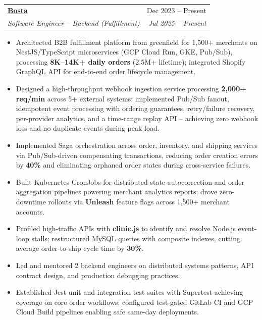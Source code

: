 \documentclass[letterpaper,11pt]{article}
\makeatletter
\newcommand{\resumeItem}[1]{
  \item\small{{#1 \vspace{-2pt}}}
}
\newcommand{\resumeSubheading}[4]{
  \vspace{-2pt}\item
    \begin{tabular*}{0.97\textwidth}[t]{l@{\extracolsep{\fill}}r}
      \textbf{#1} & #2 \\
      \textit{\small#3} & \textit{\small #4} \\
    \end{tabular*}\vspace{-7pt}
}
\newcommand{\resumeItemListStart}{\begin{itemize}}
\newcommand{\resumeItemListEnd}{\end{itemize}\vspace{-5pt}}
\makeatother
\begin{document}
    \resumeSubheading
      {\href{https://bosta.co/en-eg/home}{Bosta}}{Dec 2023 -- Present}
      {Software Engineer -- Backend (Fulfillment)}{Jul 2025 -- Present}
      \resumeItemListStart
        \resumeItem{Architected B2B fulfillment platform from greenfield for 1,500+ merchants on NestJS/TypeScript microservices (GCP Cloud Run, GKE, Pub/Sub), processing \textbf{8K--14K+ daily orders} (2.5M+ lifetime); integrated Shopify GraphQL API for end-to-end order lifecycle management.}
        \resumeItem{Designed a high-throughput webhook ingestion service processing \textbf{2,000+ req/min} across 5+ external systems; implemented Pub/Sub fanout, idempotent event processing with ordering guarantees, retry/failure recovery, per-provider analytics, and a time-range replay API -- achieving zero webhook loss and no duplicate events during peak load.}
        \resumeItem{Implemented Saga orchestration across order, inventory, and shipping services via Pub/Sub-driven compensating transactions, reducing order creation errors by \textbf{40\%} and eliminating orphaned order states during cross-service failures.}
        \resumeItem{Built Kubernetes CronJobs for distributed state autocorrection and order aggregation pipelines powering merchant analytics reports; drove zero-downtime rollouts via \textbf{Unleash} feature flags across 1,500+ merchant accounts.}
        \resumeItem{Profiled high-traffic APIs with \textbf{clinic.js} to identify and resolve Node.js event-loop stalls; restructured MySQL queries with composite indexes, cutting average order-to-ship cycle time by \textbf{30\%}.}
        \resumeItem{Led and mentored 2 backend engineers on distributed systems patterns, API contract design, and production debugging practices.}
        \resumeItem{Established Jest unit and integration test suites with Supertest achieving coverage on core order workflows; configured test-gated GitLab CI and GCP Cloud Build pipelines enabling safe same-day deployments.}
      \resumeItemListEnd
\end{document}
